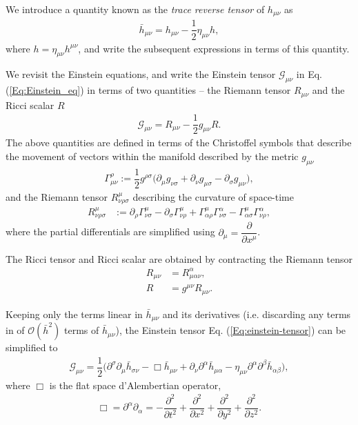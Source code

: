 We introduce a quantity known as the \textit{trace reverse tensor} of $h_{\mu\nu}$ as
\begin{align}
    \bar{h}_{\mu\nu} = h_{\mu\nu} - \dfrac{1}{2}\eta_{\mu\nu}h,
\end{align}
where $h = \eta_{\mu\nu}h^{\mu\nu}$, and write the subsequent expressions in terms of this quantity.

We revisit the Einstein equations, and write the Einstein tensor $\mathcal{G}_{\mu\nu}$ in Eq. (\ref{Eq:Einstein_eq}) in terms of two quantities -- the Riemann tensor $R_{\mu\nu}$ and the Ricci scalar $R$ 
\begin{align}
    \mathcal{G_{\mu\nu}} = R_{\mu\nu} - \dfrac{1}{2}g_{\mu\nu}R.
    \label{Eq:einstein-tensor}
\end{align}
The above quantities are defined in terms of the Christoffel symbols that describe the movement of vectors within the manifold described by the metric $g_{\mu\nu}$
\begin{align}
    \Gamma^{\rho}_{\mu\nu} := \dfrac{1}{2}g^{\rho\sigma}\big(\partial_{\mu}g_{\nu\sigma} + \partial_{\nu}g_{\mu\sigma} - \partial_{\sigma}g_{\mu\nu} \big),
\end{align}  
and the Riemann tensor $R^{\mu}_{\nu\rho\sigma}$ describing the curvature of space-time
\begin{align}
    R^{\mu}_{\nu\rho\sigma} &:= \partial_{\rho}\Gamma^{\mu}_{\nu\sigma} - \partial_{\sigma}\Gamma^{\mu}_{\nu\rho} + \Gamma^{\mu}_{\alpha\rho}\Gamma^{\alpha}_{\nu\sigma} - \Gamma_{\alpha\sigma}^{\mu}\Gamma^{\alpha}_{\nu\rho},
\end{align}
where the partial differentials are simplified using $\partial_{\mu} = \dfrac{\partial}{\partial x^{\mu}}$.

The Ricci tensor and Ricci scalar are obtained by contracting the Riemann tensor
\begin{align}
    R_{\mu\nu}  &= R^{\alpha}_{\mu\alpha\nu}, \\
    R & = g^{\mu\nu}R_{\mu\nu}. 
\end{align}

Keeping only the terms linear in $\bar{h}_{\mu\nu}$ and its derivatives (i.e. discarding any terms in of $\mathcal{O}(\bar{h}^2)$ terms of $\bar{h}_{\mu\nu}$), the Einstein tensor Eq. (\ref{Eq:einstein-tensor}) can be simplified to
\begin{align}
    \mathcal{G}_{\mu \nu}  = \dfrac{1}{2}\big( \partial^{\sigma}\partial_{\mu}\bar{h}_{\sigma\nu} -\Box\bar{h}_{\mu\nu} + \partial_{\nu}\partial^{\alpha}\bar{h}_{\mu\alpha} - \eta_{\mu\nu}\partial^{\alpha}\partial^{\beta}\bar{h}_{\alpha\beta} \big),
\end{align}
where $\Box$ is the flat space d'Alembertian operator, 
\begin{align}
    \Box = \partial^{\alpha}\partial_{\alpha} = -\dfrac{\partial^2}{\partial t^2} + \dfrac{\partial^2}{\partial x^2} + \dfrac{\partial^2}{\partial y^2} + \dfrac{\partial^2}{\partial z^2}.
\end{align}

